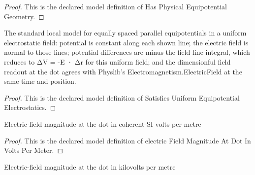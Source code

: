 \begin{proof}
  This is the declared model definition of Has Physical Equipotential Geometry.
\end{proof}
\begin{definition}
  \label{def:physics:phyx-mini-0871:phyxminiproblems-problemphyxmini0871-satisfiesuniformequipotentialelectrostatics}
  The standard local model for equally spaced parallel equipotentials in a uniform electrostatic field: potential is constant along each shown line; the electric field is normal to those lines; potential differences are minus the field line integral, which reduces to ΔV = -E · Δr for this uniform field; and the dimensionful field readout at the dot agrees with Physlib's Electromagnetism.ElectricField at the same time and position.
\end{definition}
\begin{proof}
  This is the declared model definition of Satisfies Uniform Equipotential Electrostatics.
\end{proof}
\begin{definition}
  \label{def:physics:phyx-mini-0871:phyxminiproblems-problemphyxmini0871-electricfieldmagnitudeatdotinvoltspermeter}
  Electric-field magnitude at the dot in coherent-SI volts per metre
\end{definition}
\begin{proof}
  This is the declared model definition of electric Field Magnitude At Dot In Volts Per Meter.
\end{proof}
\begin{definition}
  \label{def:physics:phyx-mini-0871:phyxminiproblems-problemphyxmini0871-electricfieldmagnitudeatdotinkilovoltspermeter}
  Electric-field magnitude at the dot in kilovolts per metre
\end{definition}
